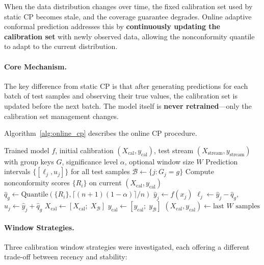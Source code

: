 When the data distribution changes over time, the fixed calibration set used by static CP becomes stale, and the coverage guarantee degrades. Online adaptive conformal prediction addresses this by \textbf{continuously updating the calibration set} with newly observed data, allowing the nonconformity quantile to adapt to the current distribution.

\paragraph{Core Mechanism.}
The key difference from static CP is that after generating predictions for each batch of test samples and observing their true values, the calibration set is updated before the next batch. The model itself is \textbf{never retrained}—only the calibration set management changes.

Algorithm~\ref{alg:online_cp} describes the online CP procedure.

\begin{algorithm}[htbp]
\caption{Online Adaptive Conformal Prediction}
\label{alg:online_cp}
\begin{algorithmic}[1]
\REQUIRE Trained model $f$, initial calibration $(X_{\text{cal}}, y_{\text{cal}})$, test stream $(X_{\text{stream}}, y_{\text{stream}})$ with group keys $G$, significance level $\alpha$, optional window size $W$
\ENSURE Prediction intervals $\{[\ell_j, u_j]\}$ for all test samples
    \STATE $\mathcal{B} \leftarrow \{j : G_j = g\}$ 
    \STATE Compute nonconformity scores $\{R_i\}$ on current $(X_{\text{cal}}, y_{\text{cal}})$
    \STATE $\hat{q}_g \leftarrow \text{Quantile}(\{R_i\}, \lceil(n+1)(1-\alpha)\rceil / n)$
        \STATE $\hat{y}_j \leftarrow f(x_j)$
        \STATE $\ell_j \leftarrow \hat{y}_j - \hat{q}_g$, \quad $u_j \leftarrow \hat{y}_j + \hat{q}_g$
    \ENDFOR
    \STATE $X_{\text{cal}} \leftarrow [X_{\text{cal}};\; X_\mathcal{B}]$ 
    \STATE $y_{\text{cal}} \leftarrow [y_{\text{cal}};\; y_\mathcal{B}]$ 
        \STATE $(X_{\text{cal}}, y_{\text{cal}}) \leftarrow \text{last } W \text{ samples}$ 
    \ENDIF
\ENDFOR
\end{algorithmic}
\end{algorithm}

\paragraph{Window Strategies.}
Three calibration window strategies were investigated, each offering a different trade-off between recency and stability:

